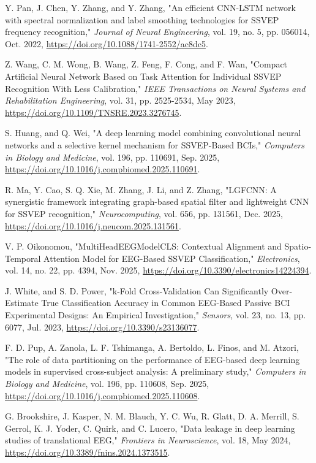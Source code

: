  Y. Pan, J. Chen, Y. Zhang, and Y. Zhang, "An efficient CNN-LSTM network with spectral normalization and label smoothing technologies for SSVEP frequency recognition," \textit{Journal of Neural Engineering}, vol. 19, no. 5, pp. 056014, Oct. 2022, \url{https://doi.org/10.1088/1741-2552/ac8dc5}.

 Z. Wang, C. M. Wong, B. Wang, Z. Feng, F. Cong, and F. Wan, "Compact Artificial Neural Network Based on Task Attention for Individual SSVEP Recognition With Less Calibration," \textit{IEEE Transactions on Neural Systems and Rehabilitation Engineering}, vol. 31, pp. 2525-2534, May 2023, \url{https://doi.org/10.1109/TNSRE.2023.3276745}.

 S. Huang, and Q. Wei, "A deep learning model combining convolutional neural networks and a selective kernel mechanism for SSVEP-Based BCIs," \textit{Computers in Biology and Medicine}, vol. 196, pp. 110691, Sep. 2025, \url{https://doi.org/10.1016/j.compbiomed.2025.110691}.

 R. Ma, Y. Cao, S. Q. Xie, M. Zhang, J. Li, and Z. Zhang, "LGFCNN: A synergistic framework integrating graph-based spatial filter and lightweight CNN for SSVEP recognition," \textit{Neurocomputing}, vol. 656, pp. 131561, Dec. 2025, \url{https://doi.org/10.1016/j.neucom.2025.131561}.

 V. P. Oikonomou, "MultiHeadEEGModelCLS: Contextual Alignment and Spatio-Temporal Attention Model for EEG-Based SSVEP Classification," \textit{Electronics}, vol. 14, no. 22, pp. 4394, Nov. 2025, \url{https://doi.org/10.3390/electronics14224394}.

 J. White, and S. D. Power, "k-Fold Cross-Validation Can Significantly Over-Estimate True Classification Accuracy in Common EEG-Based Passive BCI Experimental Designs: An Empirical Investigation," \textit{Sensors}, vol. 23, no. 13, pp. 6077, Jul. 2023, \url{https://doi.org/10.3390/s23136077}.

 F. D. Pup, A. Zanola, L. F. Tshimanga, A. Bertoldo, L. Finos, and M. Atzori, "The role of data partitioning on the performance of EEG-based deep learning models in supervised cross-subject analysis: A preliminary study," \textit{Computers in Biology and Medicine}, vol. 196, pp. 110608, Sep. 2025, \url{https://doi.org/10.1016/j.compbiomed.2025.110608}.

 G. Brookshire, J. Kasper, N. M. Blauch, Y. C. Wu, R. Glatt, D. A. Merrill, S. Gerrol, K. J. Yoder, C. Quirk, and C. Lucero, "Data leakage in deep learning studies of translational EEG," \textit{Frontiers in Neuroscience}, vol. 18, May 2024, \url{https://doi.org/10.3389/fnins.2024.1373515}.

